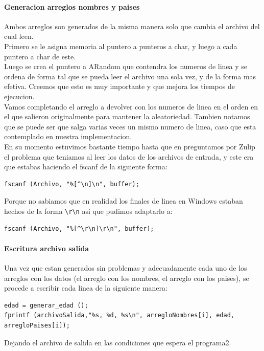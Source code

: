 \documentclass{article}
\begin{document}
	\paragraph{Generacion arreglos nombres y paises}
	Ambos arreglos son generados de la misma manera solo que cambia el archivo del cual leen.\\
	Primero se le asigna memoria al puntero a punteros a char, y luego a cada puntero a char de este. \\
	Luego se crea el puntero a ARandom que contendra los numeros de linea y se ordena de forma tal que se pueda leer el archivo una sola vez, y de la forma mas efetiva. Creemos que esto es muy importante y que mejora los tiempos de ejecucion.\\
	Vamos completando el arreglo a devolver con los numeros de linea en el orden en el que salieron originalmente para mantener la aleatoriedad.
	Tambien notamos que se puede ser que salga varias veces un mismo numero de linea, caso que esta contemplado en nuestra implementacion. \\
	En su momento estuvimos bastante tiempo hasta que en preguntamos por Zulip el problema que teniamos al leer los datos de los archivos de entrada, y este era que estabas haciendo el fscanf de la siguiente forma:
	\begin{lstlisting}[style=CStyle]
fscanf (Archivo, "%[^\n]\n", buffer);
	\end{lstlisting}
	
	Porque no sabiamos que en realidad los finales de linea en Windows estaban hechos de la forma \lstinline{\r\n} asi que pudimos adaptarlo a:
	\begin{lstlisting}[style=CStyle]
fscanf (Archivo, "%[^\r\n]\r\n", buffer);
	\end{lstlisting}

	\paragraph{Escritura archivo salida}
	Una vez que estan generados sin problemas y adecuadamente cada uno de los arreglos con los datos (el arreglo con los nombres, el arreglo con los paises), se procede a escribir cada linea de la siguiente manera:
	\begin{lstlisting}[style=CStyle]
edad = generar_edad ();
fprintf (archivoSalida,"%s, %d, %s\n", arregloNombres[i], edad, arregloPaises[i]);
	\end{lstlisting}
	
	Dejando el archivo de salida en las condiciones que espera el programa2.
	\pagebreak
\end{document}
